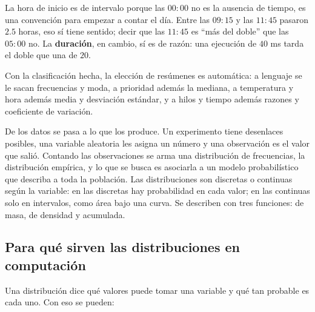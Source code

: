 \documentclass[11pt,letterpaper]{article}
\begin{document}
\begin{observacion}
    La hora de inicio es de intervalo porque las $00{:}00$ no es la
    ausencia de tiempo, es una convención para empezar a contar el
    día. Entre las $09{:}15$ y las $11{:}45$ pasaron $2.5$ horas, eso
    sí tiene sentido; decir que las $11{:}45$ es ``más del doble'' que
    las $05{:}00$ no. La \textbf{duración}, en cambio, sí es de razón:
    una ejecución de $40$ ms tarda el doble que una de $20$.
\end{observacion}

Con la clasificación hecha, la elección de resúmenes es automática: a
lenguaje se le sacan frecuencias y moda, a prioridad además la
mediana, a temperatura y hora además media y desviación estándar, y a
hilos y tiempo además razones y coeficiente de variación.


\newpage



\begin{quick_sum}
    De los datos se pasa a lo que los produce. Un experimento tiene
    desenlaces posibles, una variable aleatoria les asigna un número y
    una observación es el valor que salió. Contando las observaciones
    se arma una distribución de frecuencias, la distribución empírica,
    y lo que se busca es asociarla a un modelo probabilístico que
    describa a toda la población. Las distribuciones son discretas o
    continuas según la variable: en las discretas hay probabilidad en
    cada valor; en las continuas solo en intervalos, como área bajo una
    curva. Se describen con tres funciones: de masa, de densidad y
    acumulada.
\end{quick_sum}

\subsection*{Para qué sirven las distribuciones en computación}

Una distribución dice qué valores puede tomar una variable y qué tan
probable es cada uno. Con eso se pueden:
\end{document}
